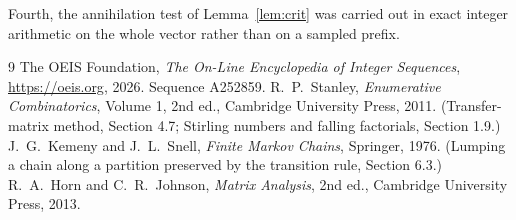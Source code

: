 \documentclass[11pt,a4paper]{article}
\theoremstyle{plain}
\theoremstyle{definition}
\begin{document}
Fourth, the annihilation test of Lemma~\ref{lem:crit} was carried out in exact integer
arithmetic on the whole vector rather than on a sampled prefix.

\begin{thebibliography}{9}
 The OEIS Foundation, \emph{The On-Line Encyclopedia of Integer
Sequences}, \url{https://oeis.org}, 2026. Sequence A252859.
 R.~P.~Stanley, \emph{Enumerative Combinatorics}, Volume 1, 2nd ed.,
Cambridge University Press, 2011. (Transfer-matrix method, Section 4.7; Stirling numbers and
falling factorials, Section 1.9.)
 J.~G.~Kemeny and J.~L.~Snell, \emph{Finite Markov Chains}, Springer,
1976. (Lumping a chain along a partition preserved by the transition rule, Section 6.3.)
 R.~A.~Horn and C.~R.~Johnson, \emph{Matrix Analysis}, 2nd ed., Cambridge
University Press, 2013.
\end{thebibliography}
\end{document}
